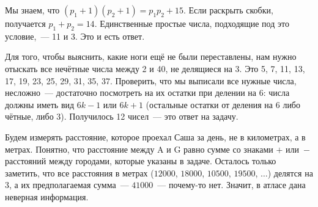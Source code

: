 \begin{itemize}
\itA Мы знаем, что $(p_1+1)(p_2+1) = p_1p_2 + 15$. Если раскрыть скобки, получается $p_1 + p_2 = 14$. Единственные простые числа, подходящие под это условие,~— 11 и 3. Это и есть ответ.

\itB Для того, чтобы выяснить, какие ноги ещё не были переставлены, нам нужно отыскать все нечётные числа между 2 и 40, не делящиеся на 3. Это 5, 7, 11, 13, 17, 19, 23, 25, 29, 31, 35, 37. Проверить, что мы выписали все нужные числа, несложно~— достаточно посмотреть на их остатки при делении на 6: числа должны иметь вид $6k-1$ или $6k+1$ (остальные остатки от деления на 6 либо чётные, либо 3). Получилось 12 чисел~— это ответ на задачу.

\itC Будем измерять расстояние, которое проехал Саша за день, не в километрах, а в метрах. Понятно, что расстояние между A и G равно сумме со знаками $+$ или~$-$ расстояний между городами, которые указаны в задаче. Осталось только заметить, что все расстояния в метрах ($12000$, $18000$, $10500$, $19500$, $\ldots$) делятся на 3, а их предполагаемая сумма~— $41000$~— почему-то нет. Значит, в атласе дана неверная информация.
\end{itemize}